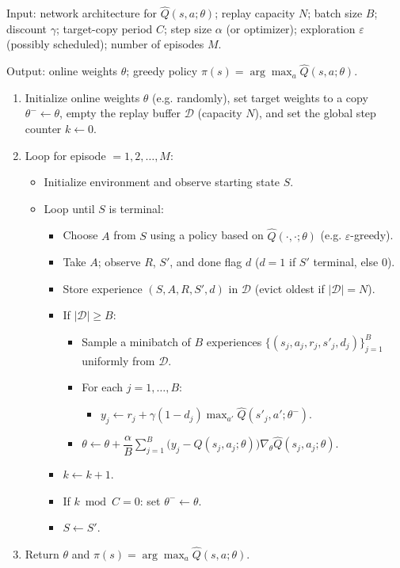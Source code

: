 \begin{implnote}
Input: network architecture for $\hat{Q}(s,a;\theta)$; replay capacity $N$; batch size $B$; discount $\gamma$; target-copy period $C$; step size $\alpha$ (or optimizer); exploration $\varepsilon$ (possibly scheduled); number of episodes $M$.

Output: online weights $\theta$; greedy policy $\pi(s)=\arg\max_a\hat{Q}(s,a;\theta)$.

\begin{enumerate}
\item Initialize online weights $\theta$ (e.g. randomly), set target weights to a copy $\theta^-\leftarrow\theta$, empty the replay buffer $\mathcal{D}$ (capacity $N$), and set the global step counter $k\leftarrow 0$.
\item Loop for episode $=1,2,\ldots,M$:
\begin{itemize}
\item Initialize environment and observe starting state $S$.
\item Loop until $S$ is terminal:
\begin{itemize}
\item Choose $A$ from $S$ using a policy based on $\hat{Q}(\cdot,\cdot;\theta)$ (e.g. $\varepsilon$-greedy).
\item Take $A$; observe $R$, $S'$, and done flag $d$ ($d=1$ if $S'$ terminal, else $0$).
\item Store experience $(S,A,R,S',d)$ in $\mathcal{D}$ (evict oldest if $|\mathcal{D}|=N$).
\item If $|\mathcal{D}|\geq B$:
\begin{itemize}
\item Sample a minibatch of $B$ experiences $\{(s_j,a_j,r_j,s'_j,d_j)\}_{j=1}^{B}$ uniformly from $\mathcal{D}$.
\item For each $j=1,\ldots,B$:
\begin{itemize}
\item $y_j\leftarrow r_j+\gamma(1-d_j)\max_{a'}\hat{Q}(s'_j,a';\theta^-)$.
\end{itemize}
\item $\theta\leftarrow\theta+\dfrac{\alpha}{B}\sum_{j=1}^{B}\bigl(y_j-\hat{Q}(s_j,a_j;\theta)\bigr)\nabla_\theta\hat{Q}(s_j,a_j;\theta)$.
\end{itemize}
\item $k\leftarrow k+1$.
\item If $k\bmod C=0$: set $\theta^-\leftarrow\theta$.
\item $S\leftarrow S'$.
\end{itemize}
\end{itemize}
\item Return $\theta$ and $\pi(s)=\arg\max_a\hat{Q}(s,a;\theta)$.
\end{enumerate}

\end{implnote}

